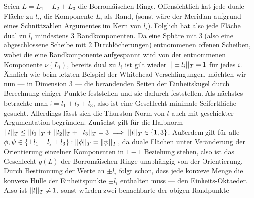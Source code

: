     Seien $L=L_1 + L_2 + L_3$ die Borromäischen Ringe. Offensichtlich hat jede duale Fläche zu $l_i$, die Komponente $L_i$ als Rand, (sonst wäre der Meridian aufgrund eines Schnittzahlen Argumentes im Kern von $l_i$). Folglich hat also jede Fläche dual zu $l_i$ mindestens 3 Randkomponenten. Da eine Sphäre mit 3 (also eine abgeschlossene Scheibe mit 2 Durchlöcherungen) entnommenen offenen Scheiben, wobei die eine Randkomponente aufgespannt wird von der entnommenen Komponente $\nu(L_i)$, bereits dual zu $l_i$ ist gilt wieder $||\pm l_i||_T=1$ für jedes $i$. Ähnlich wie beim letzten Beispiel der Whitehead Verschlingungen, möchten wir nun --- in Dimension 3 --- die berandenden Seiten der Einheitskugel durch Berechnung einiger Punkte feststellen und sie dadurch feststellen. Als nächstes betrachte man $l=l_1+l_2+l_3$, also ist eine Geschlecht-minimale Seifertfläche gesucht. Allerdings lässt sich die Thurston-Norm von $l$ auch mit geschickter Argumentation begründen. Zunächst gilt für die Halbnorm $||l||_T \leq ||l_1||_T + ||l_2||_T + ||l_3||_T=3 \implies ||l||_T \in \{1,3\}$. Außerdem gilt für alle $\phi,\psi \in \{\pm l_1 \pm l_2 \pm l_3\}: ||\phi||_T = ||\psi||_T$, da duale Flächen unter Veränderung der Orientierung einzelner Komponenten in $1-1$ Beziehung stehen, also ist das Geschlecht $g(L)$ der Borromäischen Ringe unabhängig von der Orientierung. Durch Bestimmung der Werte an $\pm l_i$ folgt schon, dass jede konxeve Menge die konvexe Hülle der Einheitspunkte $\pm l_i$ enthalten muss --- den Einheits-Oktaeder. Also ist $||l||_T \neq 1$, sonst würden zwei benachbarte der obigen Randpunkte 

